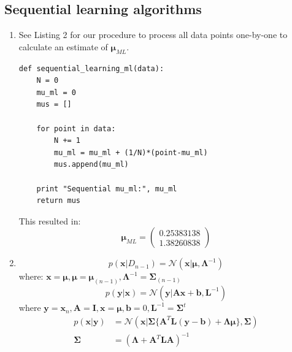 \documentclass[a4paper,10pt]{article}
\numberwithin{equation}{section} %
\numberwithin{figure}{section} %
\numberwithin{table}{section} %
\theoremstyle{mytheor}
\begin{document}
\subsection{Sequential learning algorithms}
\begin{enumerate}
	\item See Listing 2 for our procedure to process all data points one-by-one to calculate an estimate of $\boldsymbol \mu_{ML}$. \begin{lstlisting}[label={list:first},caption=Python code for function \textit{sequential\_learning\_ml(data)}.]
def sequential_learning_ml(data):
    N = 0
    mu_ml = 0
    mus = []

    for point in data:
        N += 1
        mu_ml = mu_ml + (1/N)*(point-mu_ml)
        mus.append(mu_ml)

    print "Sequential mu_ml:", mu_ml
    return mus
    		\end{lstlisting}
    		This resulted in:
    		\begin{equation}
    		\boldsymbol \mu_{ML} = \begin{pmatrix} 0.25383138 \\ 1.38260838 \end{pmatrix}
    		\end{equation}
	\item \begin{equation}p(\boldsymbol{x} | D_{n-1}) = \mathcal{N}(\boldsymbol{x} | \boldsymbol{\mu}, \boldsymbol{\Lambda}^{-1}) \tag{Bishop 2.113}
		\end{equation}
where: $\boldsymbol{x} = \boldsymbol{\mu}, \boldsymbol{\mu} = \boldsymbol{\mu}_{(n-1)}, \boldsymbol{\Lambda}^{-1} = \boldsymbol{\Sigma}_{(n-1)}$
		\begin{equation}p(\boldsymbol{y} | \boldsymbol{x}) = \mathcal{N}(\boldsymbol{y} | \boldsymbol{Ax} + \boldsymbol{b}, \boldsymbol{L}^{-1}) \tag{Bishop 2.114}
		\end{equation}
where $\boldsymbol{y} = \boldsymbol{x}_n, \boldsymbol{A} = \boldsymbol{I}, \boldsymbol{x} = \boldsymbol{\mu}, \boldsymbol{b} = 0, \boldsymbol{L}^{-1} = \boldsymbol{\Sigma}^t$
		\begin{align} p(\boldsymbol{x} | \boldsymbol y) &= \mathcal{N}(\boldsymbol{x} | \boldsymbol{\Sigma} \{ \boldsymbol{A}^T \boldsymbol{L}(\boldsymbol{y} - \boldsymbol{b}) + \boldsymbol{\Lambda\mu}\}, \boldsymbol{\Sigma}) \tag{Bishop 2.116}\\
	 	\boldsymbol{\Sigma} &= (\boldsymbol{\Lambda} + \boldsymbol{A}^T\boldsymbol{LA})^{-1} \tag{Bishop 2.117}
	 	\end{align}

\end{enumerate}
\end{document}
